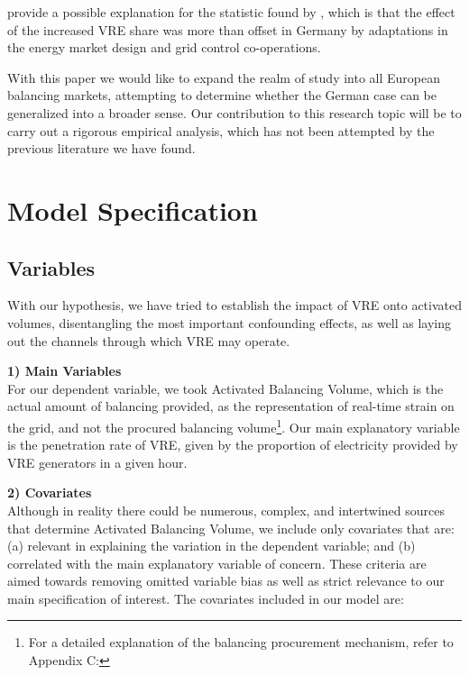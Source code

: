 \documentclass[12pt]{article}
\begin{document}
\citet{Ocker2017} provide a possible explanation for the statistic found by \citet{Hirth2015a}, which is that the effect of the increased VRE share was more than offset in Germany by adaptations in the energy market design and grid control co-operations.\par

With this paper we would like to expand the realm of study into all European balancing markets, attempting to determine whether the German case can be generalized into a broader sense. Our contribution to this research topic will be to carry out a rigorous empirical analysis, which has not been attempted by the previous literature we have found.\par

\section{Model Specification}
\label{section:Model}
\subsection{Variables}
With our hypothesis, we have tried to establish the impact of VRE onto activated volumes, disentangling the most important confounding effects, as well as laying out the channels through which VRE may operate.\par

\textbf{1) Main Variables}\\
For our dependent variable, we took Activated Balancing Volume, which is the actual amount of balancing provided, as the representation of real-time strain on the grid, and not the procured balancing volume\footnote{For a detailed explanation of the balancing procurement mechanism, refer to Appendix C: }. Our main explanatory variable is the penetration rate of VRE, given by the proportion of electricity provided by VRE generators in a given hour. \par

\textbf{2) Covariates}\\
Although in reality there could be numerous, complex, and intertwined sources that determine Activated Balancing Volume, we include only covariates that are: (a) relevant in explaining the variation in the dependent variable; and (b) correlated with the main explanatory variable of concern. These criteria are aimed towards removing omitted variable bias as well as strict relevance to our main specification of interest. The covariates included in our model are:\par
\end{document}

